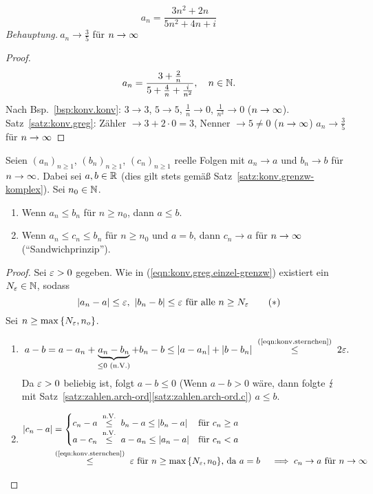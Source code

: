 \documentclass[12pt]{scrreprt}
\begin{document}
\begin{bsp}
\label{bsp:konv.greg}
\[a_n = \frac{3n^2+2n}{5n^2+4n+i}\]
\emph{Behauptung.}$\ a_n\to\frac35$ für $n\rightarrow\infty$
\begin{proof}
\[a_n=\frac{3+\frac{2}{n}}{5+\frac{4}{n}+\frac{i}{n^2}},\quad n\in\mathbb{N}.\]
Nach Bsp.~\ref{bsp:konv.konv}: $3\to3$, $5\to5$, $\frac{1}{n}\to0$, $\frac{1}{n^2}\to0$ ($n\rightarrow\infty$). Satz~\ref{satz:konv.greg}: Zähler $\to 3+2\cdot0=3$, Nenner $\to 5\ne0$ ($n\rightarrow\infty$)  $a_n\to\frac35$ für $n\rightarrow\infty$
\end{proof}
\end{bsp}

\begin{satz}
\label{satz:konv.grenzw-ordn}
Seien $(a_n)_{n\ge1}$, $(b_n)_{n\ge1}$, $(c_n)_{n\ge1}$ reelle Folgen mit $a_n \to a$ und $b_n \to b$ für $n\rightarrow\infty$. Dabei sei $a, b\in\mathbb{R}$ (dies gilt stets gemäß Satz~\ref{satz:konv.grenzw-komplex}). Sei $n_0\in\mathbb{N}$.
\begin{enumerate}
\item Wenn $a_n\le b_n$ für $n\ge n_0$, dann $a\le b$. \label{satz:konv.grenzw-ordn.a}
\item Wenn $a_n\le c_n\le b_n$ für $n\ge n_0$ und $a=b$, dann $c_n\to a$ für $n\rightarrow\infty$ ("`Sandwichprinzip"'). \label{satz:konv.grenzw-ordn.b}
\end{enumerate}
\end{satz}
\begin{proof}
Sei $\varepsilon>0$ gegeben. Wie in (\ref{eqn:konv.greg.einzel-grenzw}) existiert ein $N_\varepsilon\in\mathbb{N}$, sodass
\begin{equation}\left\lvert a_n-a\right\lvert\le\varepsilon\text{, }\left\lvert b_n-b\right\lvert\le\varepsilon\text{ für alle }n\ge N_\varepsilon \label{eqn:konv.sternchen}\tag {$*$} \end{equation}
Sei $n\ge\max{\{N_\varepsilon, n_o\}}$.
\begin{enumerate}
\item \[a-b = a-a_n+\underbrace{a_n-b_n}_{\le0\text{ (n.V.)}}+b_n-b \le \abs{a-a_n}+\abs{b-b_n} \nach{\le}{(\ref{eqn:konv.sternchen})} 2\ep.\] Da $\varepsilon>0$ beliebig ist, folgt $a-b\le0$ (Wenn $a-b>0$ wäre, dann folgte $\lightning$ mit Satz~\ref{satz:zahlen.arch-ord}\ref{satz:zahlen.arch-ord.c}) \folgt $a\le b$.
\item 
\begin{align*}
\abs{c_n-a}&=\begin{cases} c_n-a \nach{\le}{n.V.} b_n-a \le \abs{b_n-a} & \text{für }c_n\ge a\\a-c_n \nach{\le}{n.V.} a-a_n \le \abs{a_n-a} & \text{für }c_n<a \end{cases}\\
&\negthickspace\nach{\le}{(\ref{eqn:konv.sternchen})}\ep \text{ für }n\ge\max{\{N_\ep,n_0\}}\text{, da }a=b \quad\folgt c_n\to a\text{ für }\ninf
\end{align*}
\end{enumerate}
\end{proof}
\end{document}
